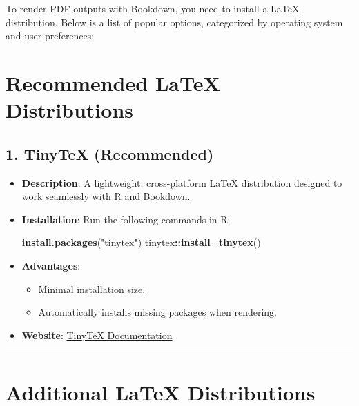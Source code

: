 \documentclass[
]{book}
\newenvironment{Shaded}{\begin{snugshade}}{\end{snugshade}}
\newcommand{\FunctionTok}[1]{\textcolor[rgb]{0.13,0.29,0.53}{\textbf{#1}}}
\newcommand{\NormalTok}[1]{#1}
\newcommand{\SpecialCharTok}[1]{\textcolor[rgb]{0.81,0.36,0.00}{\textbf{#1}}}
\newcommand{\StringTok}[1]{\textcolor[rgb]{0.31,0.60,0.02}{#1}}
\providecommand{\tightlist}{%
  \setlength{\itemsep}{0pt}\setlength{\parskip}{0pt}}
\theoremstyle{definition}
\theoremstyle{definition}
\theoremstyle{definition}
\theoremstyle{definition}
\theoremstyle{remark}
\begin{document}
To render PDF outputs with Bookdown, you need to install a LaTeX distribution. Below is a list of popular options, categorized by operating system and user preferences:

\section{Recommended LaTeX Distributions}\label{recommended-latex-distributions}

\subsection{\texorpdfstring{1. \textbf{TinyTeX} (Recommended)}{1. TinyTeX (Recommended)}}\label{tinytex-recommended}

\begin{itemize}
\item
  \textbf{Description}: A lightweight, cross-platform LaTeX distribution designed to work seamlessly with R and Bookdown.
\item
  \textbf{Installation}: Run the following commands in R:

\begin{Shaded}
\begin{Highlighting}[]
\FunctionTok{install.packages}\NormalTok{(}\StringTok{"tinytex"}\NormalTok{)}
\NormalTok{tinytex}\SpecialCharTok{::}\FunctionTok{install\_tinytex}\NormalTok{()}
\end{Highlighting}
\end{Shaded}
\item
  \textbf{Advantages}:

  \begin{itemize}
  \tightlist
  \item
    Minimal installation size.
  \item
    Automatically installs missing packages when rendering.
  \end{itemize}
\item
  \textbf{Website}: \href{https://yihui.org/tinytex/}{TinyTeX Documentation}
\end{itemize}

\begin{center}\rule{0.5\linewidth}{0.5pt}\end{center}

\section{Additional LaTeX Distributions}\label{additional-latex-distributions}
\end{document}
